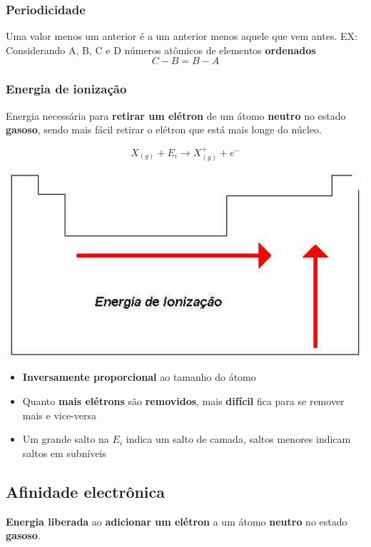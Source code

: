 \documentclass{article}
\begin{document}
\subsubsection{Periodicidade}
Uma valor menos um anterior é a um anterior menos aquele que vem antes.
EX: Considerando A, B, C e D números atômicos de elementos \textbf{ordenados} 
\begin{equation}
    C-B = B-A
\end{equation}

\subsubsection{Energia de ionização}
Energia necessária para \textbf{retirar um elétron} de um átomo \textbf{neutro} no estado \textbf{gasoso}, sendo mais fácil retirar o elétron que está mais longe do núcleo.

\begin{equation}
    X_{(g)} + E_i \rightarrow X^+_{(g)} + e^-
\end{equation}

\begin{center}
    \includegraphics[width=1\textwidth]{tabela_periodica_energia_ionizacao}
\end{center}

\begin{itemize}
    \item \textbf{Inversamente proporcional} ao tamanho do átomo
    \item Quanto \textbf{mais elétrons} são \textbf{removidos}, mais \textbf{difícil} fica para se remover mais e vice-versa
    \item Um grande salto na $ E_i $ indica um salto de camada, saltos menores indicam saltos em subníveis
\end{itemize}

\subsection{Afinidade electrônica}
\textbf{Energia liberada} ao \textbf{adicionar um elétron} a um átomo \textbf{neutro} no estado \textbf{gasoso}.
\end{document}
